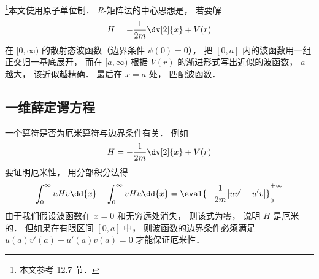 

\footnote{本文参考 \cite{Brandsen} 12.7 节．}本文使用原子单位制． $R$-矩阵法的中心思想是， 若要解
\begin{equation}
H = -\frac{1}{2m}\dv[2]{x} + V(r)
\end{equation}
在 $[0, \infty)$ 的散射态波函数（边界条件 $\psi(0) = 0$）， 把 $[0,a]$ 内的波函数用一组正交归一基底展开， 而在 $[a,\infty)$ 根据 $V(r)$ 的渐进形式写出近似的波函数， $a$ 越大， 该近似越精确． 最后在 $x=a$ 处， 匹配波函数．

\subsection{一维薛定谔方程}
一个算符是否为厄米算符与边界条件有关． 例如
\begin{equation}
H = -\frac{1}{2m}\dv[2]{x} + V(r)
\end{equation}
要证明厄米性， 用分部积分法得
\begin{equation}\label{Rmat_eq1}
\int_{0}^{\infty} uHv\dd{x} - \int_{0}^{\infty} vHu\dd{x}
= \eval{-\frac{1}{2m}[uv' - u'v]}_{0}^{+\infty}
\end{equation}
由于我们假设波函数在 $x=0$ 和无穷远处消失， 则该式为零， 说明 $H$ 是厄米的． 但如果在有限区间 $[0, a]$ 中， 则波函数的边界条件必须满足 $u(a)v'(a) - u'(a)v(a) = 0$ 才能保证厄米性．

